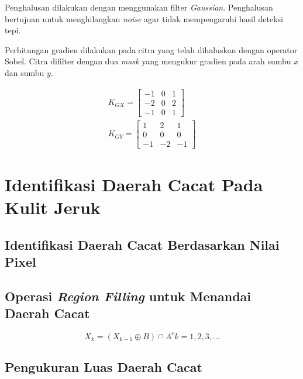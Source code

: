 \documentclass[laporan.tex]{subfiles}
\begin{document}
Penghalusan dilakukan dengan menggunakan filter \emph{Gaussian}. Penghalusan bertujuan untuk menghilangkan \emph{noise} agar tidak mempengaruhi hasil deteksi tepi.

Perhitungan gradien dilakukan pada citra yang telah dihaluskan dengan operator Sobel. Citra difilter dengan dua \emph{mask} yang mengukur gradien pada arah sumbu $x$ dan sumbu $y$.

\begin{equation}
\begin{split}
K_{GX} = \begin{bmatrix}
-1 & 0 & 1 \\
-2 & 0 & 2 \\
-1 & 0 & 1
\end{bmatrix}
\\
K_{GY} = \begin{bmatrix}
1 & 2 & 1 \\
0 & 0 & 0 \\
-1 & -2 & -1
\end{bmatrix}
\end{split}
\end{equation}

\section{Identifikasi Daerah Cacat Pada Kulit Jeruk}

\subsection{Identifikasi Daerah Cacat Berdasarkan Nilai Pixel}

\subsection{Operasi \emph{Region Filling} untuk Menandai Daerah Cacat}

\begin{equation}
X_k = (X_{k-1} \oplus B) \cap A^c  k=1,2,3,\ldots
\end{equation}

\subsection{Pengukuran Luas Daerah Cacat}
\end{document}
